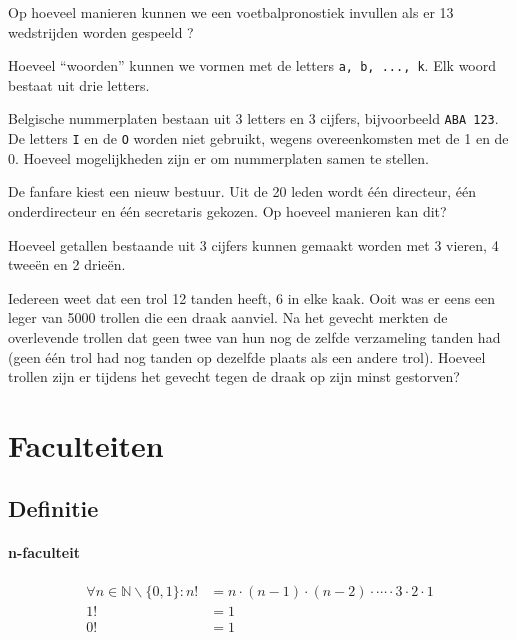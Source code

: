 \documentclass[12pt,a4paper,twoside]{article}
\begin{document}
\begin{oefening}
Op hoeveel manieren kunnen we een voetbalpronostiek invullen als er 13
wedstrijden worden gespeeld ?
\end{oefening}

\begin{oefening}
Hoeveel “woorden” kunnen we vormen met de letters \texttt{a, b, ..., k}. Elk woord
bestaat uit drie letters.
\end{oefening}

\begin{oefening}
Belgische nummerplaten bestaan uit 3 letters en 3 cijfers, bijvoorbeeld \texttt{ABA 123}. De letters \texttt{I} en de \texttt{O} worden niet gebruikt, wegens overeenkomsten met de 1 en de 0. Hoeveel mogelijkheden zijn er om nummerplaten samen te stellen.
\end{oefening}

\begin{oefening} %
De fanfare kiest een nieuw bestuur. Uit de 20 leden wordt één directeur, één onderdirecteur en één secretaris gekozen. Op hoeveel manieren kan dit?
\end{oefening}

\begin{oefening} %
Hoeveel getallen bestaande uit 3 cijfers kunnen gemaakt worden met 3 vieren, 4 tweeën en 2 drieën.
\end{oefening}

\begin{oefening}
Iedereen weet dat een trol 12 tanden heeft, 6 in elke kaak. Ooit was er eens een leger van 5000 trollen die een draak aanviel. Na het gevecht merkten de overlevende trollen dat geen twee van hun nog de zelfde verzameling tanden had (geen één trol had nog tanden op dezelfde plaats als een andere trol). Hoeveel trollen zijn er tijdens het gevecht tegen de draak op zijn minst gestorven?
\end{oefening}

\cleardoublepage
\section{Faculteiten}

\subsection{Definitie}

\paragraph*{n-faculteit}
\begin{mdframed}
\begin{align*}
\forall n \in \mathbb{N}\backslash\{0,1\}: n!&=n\cdot(n-1)\cdot(n-2)\cdot \cdots \cdot 3\cdot2\cdot1\\
                           1!&=1\\
                           0!&=1\\
\end{align*}
\end{mdframed}
\end{document}
